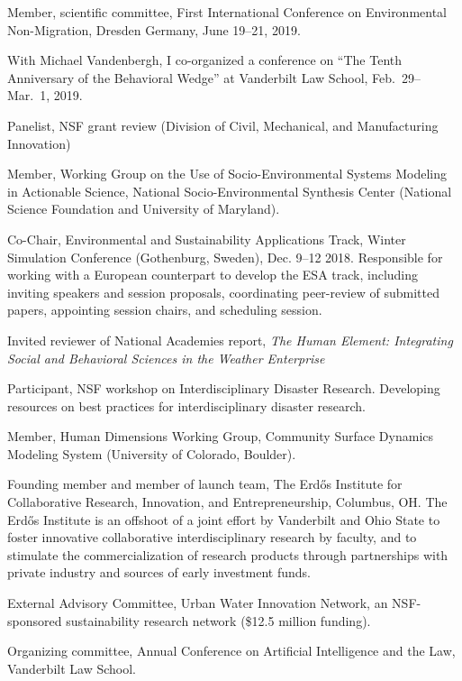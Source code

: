 \item[2019] Member, scientific committee, First International Conference on Environmental Non-Migration, Dresden Germany, June 19--21, 2019.
\item[2019] With Michael Vandenbergh, I co-organized a conference on ``The Tenth Anniversary of the Behavioral Wedge'' at Vanderbilt Law School, Feb.~29--Mar.~1, 2019.
\item[2018] Panelist, NSF grant review (Division of Civil, Mechanical, and Manufacturing Innovation)
\item[2018] Member, Working Group on the Use of Socio-Environmental Systems Modeling in Actionable Science, National Socio-Environmental Synthesis Center (National Science Foundation and University of Maryland).
\item[2018] Co-Chair, Environmental and Sustainability Applications Track, Winter Simulation Conference (Gothenburg, Sweden), Dec. 9--12 2018. Responsible for working with a European counterpart to develop the ESA track, including inviting speakers and session proposals, coordinating peer-review of submitted papers, appointing session chairs, and scheduling session.
\item[2017] Invited reviewer of National Academies report, \emph{The Human Element: Integrating Social and Behavioral Sciences in the Weather Enterprise}
\item[2017--2018] Participant, NSF workshop on Interdisciplinary Disaster Research. Developing resources on best practices for interdisciplinary disaster research.
\item[2017--present] Member, Human Dimensions Working Group, Community Surface Dynamics Modeling System (University of Colorado, Boulder).
\item[2017] Founding member and member of launch team, The Erd\H{o}s Institute for Collaborative Research, Innovation, and Entrepreneurship, Columbus, OH. The Erd\H{o}s Institute is an offshoot of
a joint effort by Vanderbilt and Ohio State to foster innovative collaborative interdisciplinary research by faculty, and to stimulate the commercialization of research products through partnerships
with private industry and sources of early investment funds.
\item[2016--present] External Advisory Committee, Urban Water Innovation Network, an NSF-sponsored sustainability research network (\$12.5 million funding).
\item[2016--present] Organizing committee, Annual Conference on Artificial Intelligence and the Law, Vanderbilt Law School.
